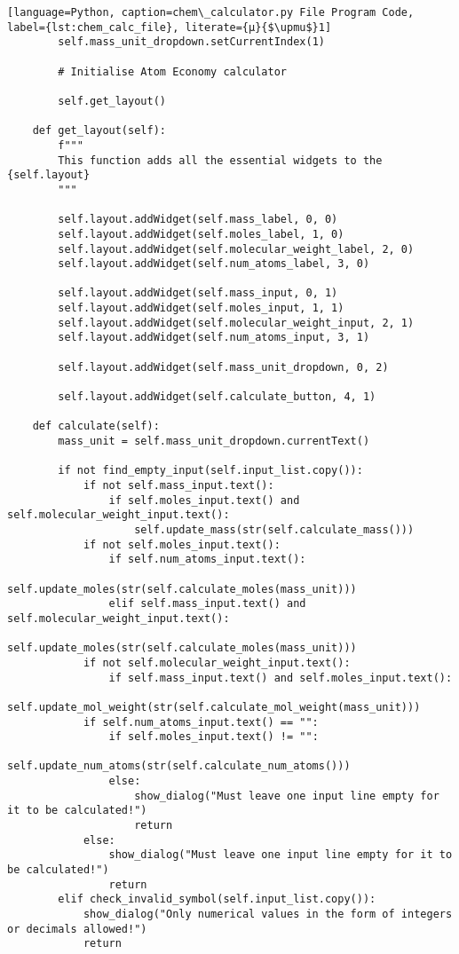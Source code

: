 \begin{lstlisting}[language=Python, caption=chem\_calculator.py File Program Code, label={lst:chem_calc_file}, literate={μ}{$\upmu$}1]
        self.mass_unit_dropdown.setCurrentIndex(1)

        # Initialise Atom Economy calculator

        self.get_layout()

    def get_layout(self):
        f"""
        This function adds all the essential widgets to the {self.layout} 
        """

        self.layout.addWidget(self.mass_label, 0, 0)
        self.layout.addWidget(self.moles_label, 1, 0)
        self.layout.addWidget(self.molecular_weight_label, 2, 0)
        self.layout.addWidget(self.num_atoms_label, 3, 0)

        self.layout.addWidget(self.mass_input, 0, 1)
        self.layout.addWidget(self.moles_input, 1, 1)
        self.layout.addWidget(self.molecular_weight_input, 2, 1)
        self.layout.addWidget(self.num_atoms_input, 3, 1)

        self.layout.addWidget(self.mass_unit_dropdown, 0, 2)

        self.layout.addWidget(self.calculate_button, 4, 1)

    def calculate(self):
        mass_unit = self.mass_unit_dropdown.currentText()

        if not find_empty_input(self.input_list.copy()):
            if not self.mass_input.text():
                if self.moles_input.text() and self.molecular_weight_input.text():
                    self.update_mass(str(self.calculate_mass()))
            if not self.moles_input.text():
                if self.num_atoms_input.text():
                    self.update_moles(str(self.calculate_moles(mass_unit)))
                elif self.mass_input.text() and self.molecular_weight_input.text():
                    self.update_moles(str(self.calculate_moles(mass_unit)))
            if not self.molecular_weight_input.text():
                if self.mass_input.text() and self.moles_input.text():
                    self.update_mol_weight(str(self.calculate_mol_weight(mass_unit)))
            if self.num_atoms_input.text() == "":
                if self.moles_input.text() != "":
                    self.update_num_atoms(str(self.calculate_num_atoms()))
                else:
                    show_dialog("Must leave one input line empty for it to be calculated!")
                    return
            else:
                show_dialog("Must leave one input line empty for it to be calculated!")
                return
        elif check_invalid_symbol(self.input_list.copy()):
            show_dialog("Only numerical values in the form of integers or decimals allowed!")
            return


\end{lstlisting}
